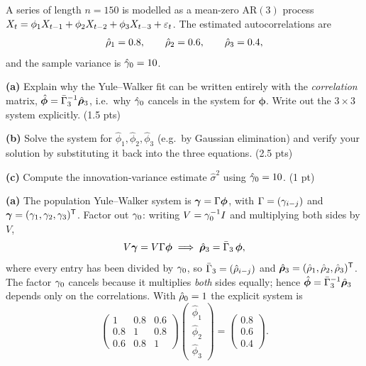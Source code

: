 \documentclass[11pt]{article}
\begin{document}
\statementstart
A series of length $n=150$ is modelled as a mean-zero $\mathrm{AR}(3)$ process
$X_t=\phi_1X_{t-1}+\phi_2X_{t-2}+\phi_3X_{t-3}+\varepsilon_t$. The estimated
autocorrelations are
\[
\hat{\rho}_1=0.8,\qquad \hat{\rho}_2=0.6,\qquad \hat{\rho}_3=0.4,
\]
and the sample variance is $\hat{\gamma}_0=10$.

\textbf{(a)} Explain why the Yule--Walker fit can be written entirely with the \emph{correlation} matrix, $\hat{\boldsymbol\phi}=\bar\Gamma_3^{-1}\hat{\boldsymbol{\rho}}_3$, i.e.\ why $\hat{\gamma}_0$ cancels in the system for $\boldsymbol\phi$. Write out the $3\times3$ system explicitly. \hfill(1.5 pts)

\textbf{(b)} Solve the system for $\hat\phi_1,\hat\phi_2,\hat\phi_3$ (e.g.\ by Gaussian elimination) and verify your solution by substituting it back into the three equations. \hfill(2.5 pts)

\textbf{(c)} Compute the innovation-variance estimate $\hat\sigma^2$ using $\hat{\gamma}_0=10$. \hfill(1 pt)
\statementend

\textbf{(a)} The population Yule--Walker system is
$\boldsymbol{\gamma}=\Gamma\boldsymbol\phi$, with $\Gamma=(\gamma_{i-j})$ and
$\boldsymbol{\gamma}=(\gamma_1,\gamma_2,\gamma_3)^{\mathsf{T}}$. Factor out $\gamma_0$: writing
$V=\gamma_0^{-1}I$ and multiplying both sides by $V$,
\[
V\boldsymbol{\gamma}=V\Gamma\boldsymbol\phi
\;\Longrightarrow\;
\hat{\boldsymbol{\rho}}_3=\bar\Gamma_3\,\boldsymbol\phi,
\]
where every entry has been divided by $\gamma_0$, so
$\bar\Gamma_3=(\hat{\rho}_{i-j})$ and $\hat{\boldsymbol{\rho}}_3=(\hat{\rho}_1,\hat{\rho}_2,\hat{\rho}_3)^{\mathsf{T}}$.
The factor $\gamma_0$ cancels because it multiplies \emph{both} sides equally;
hence $\hat{\boldsymbol\phi}=\bar\Gamma_3^{-1}\hat{\boldsymbol{\rho}}_3$ depends only
on the correlations. With $\hat{\rho}_0=1$ the explicit system is
\[
\begin{pmatrix}1 & 0.8 & 0.6\\ 0.8 & 1 & 0.8\\ 0.6 & 0.8 & 1\end{pmatrix}
\begin{pmatrix}\hat\phi_1\\ \hat\phi_2\\ \hat\phi_3\end{pmatrix}
=\begin{pmatrix}0.8\\ 0.6\\ 0.4\end{pmatrix}.
\]
\end{document}
